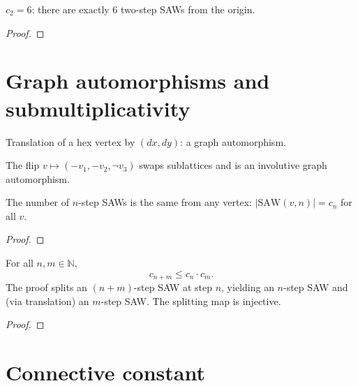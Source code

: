 \begin{lemma}[SAW count $c_2 = 6$]\label{lem:saw_count_two}
\leanok
{}
  $c_2 = 6$: there are exactly $6$ two-step SAWs from the origin.
\end{lemma}
\begin{proof}
\leanok
\end{proof}


\section{Graph automorphisms and submultiplicativity}

\begin{definition}[Translation]\label{def:hex_translate}
\leanok
{}
  Translation of a hex vertex by $(dx, dy)$: a graph automorphism.
\end{definition}

\begin{definition}\label{def:hex_flip}
\leanok
{}
  The flip $v \mapsto (-v_1, -v_2, \lnot v_3)$ swaps sublattices and is an
  involutive graph automorphism.
\end{definition}

\begin{lemma}\label{lem:saw_count_vertex_indep}
\leanok
{}
  The number of $n$-step SAWs is the same from any vertex:
  $|\mathrm{SAW}(v, n)| = c_n$ for all $v$.
\end{lemma}
\begin{proof}
\leanok
\end{proof}

\begin{theorem}[Submultiplicativity]\label{thm:submult}
\leanok
{}
  For all $n, m \in \mathbb{N}$,
  \[ c_{n+m} \leq c_n \cdot c_m. \]
  The proof splits an $(n{+}m)$-step SAW at step $n$, yielding an $n$-step SAW
  and (via translation) an $m$-step SAW. The splitting map is injective.
\end{theorem}
\begin{proof}
\leanok
\end{proof}


\section{Connective constant}

